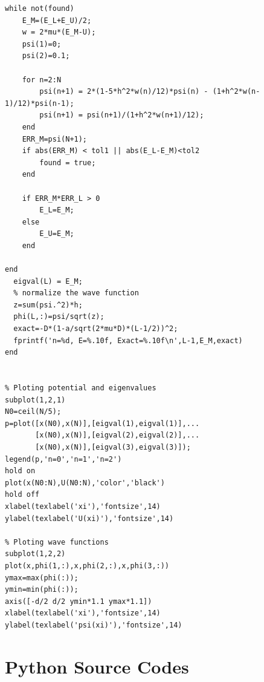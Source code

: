 \begin{verbatim}
while not(found)
    E_M=(E_L+E_U)/2;
    w = 2*mu*(E_M-U);
    psi(1)=0;
    psi(2)=0.1;
 
    for n=2:N
        psi(n+1) = 2*(1-5*h^2*w(n)/12)*psi(n) - (1+h^2*w(n-1)/12)*psi(n-1);
        psi(n+1) = psi(n+1)/(1+h^2*w(n+1)/12);
    end
    ERR_M=psi(N+1);
    if abs(ERR_M) < tol1 || abs(E_L-E_M)<tol2
        found = true;
    end
    
    if ERR_M*ERR_L > 0 
        E_L=E_M;
    else
        E_U=E_M;
    end

end
  eigval(L) = E_M;
  % normalize the wave function
  z=sum(psi.^2)*h;
  phi(L,:)=psi/sqrt(z);
  exact=-D*(1-a/sqrt(2*mu*D)*(L-1/2))^2;
  fprintf('n=%d, E=%.10f, Exact=%.10f\n',L-1,E_M,exact)
end


% Ploting potential and eigenvalues
subplot(1,2,1)
N0=ceil(N/5);
p=plot([x(N0),x(N)],[eigval(1),eigval(1)],...
       [x(N0),x(N)],[eigval(2),eigval(2)],...
       [x(N0),x(N)],[eigval(3),eigval(3)]);
legend(p,'n=0','n=1','n=2')
hold on
plot(x(N0:N),U(N0:N),'color','black')
hold off
xlabel(texlabel('xi'),'fontsize',14)
ylabel(texlabel('U(xi)'),'fontsize',14)

% Ploting wave functions
subplot(1,2,2)
plot(x,phi(1,:),x,phi(2,:),x,phi(3,:))
ymax=max(phi(:));
ymin=min(phi(:));
axis([-d/2 d/2 ymin*1.1 ymax*1.1])
xlabel(texlabel('xi'),'fontsize',14)
ylabel(texlabel('psi(xi)'),'fontsize',14)
\end{verbatim}
\normalsize


\bigskip
\noindent
\section*{Python Source Codes}
\setcounter{program}{0}

